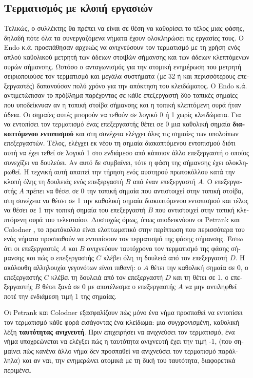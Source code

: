 \begin{greek}
\subsection{Τερματισμός με κλοπή εργασιών}
Τελικώς, ο συλλέκτης θα πρέπει να είναι σε θέση να καθορίσει
το τέλος μιας φάσης, δηλαδή πότε όλα τα συνεργαζόμενα νήματα
έχουν ολοκληρώσει τις εργασίες τους. Ο Endo κ.ά. \cite{DBLP:conf/sc/EndoTY97}
προσπάθησαν αρχικώς να ανιχνεύσουν τον τερματισμό με τη χρήση
ενός απλού καθολικού μετρητή των άδειων στοιβών σήμανσης και
των άδειων κλεπτόμενων ουρών σήμανσης. Ωστόσο ο ανταγωνισμός
για την ατομική ενημέρωση του μετρητή σειριοποιούσε τον τερματισμό
και μεγάλα συστήματα (με 32 ή και περισσότερους επεξεργαστές)
δαπανούσαν πολύ χρόνο για την απόκτηση του κλειδώματος.
O Endo κ.ά. αντιμετώπισαν το πρόβλημα παρέχοντας σε κάθε επεξεργαστή
δύο τοπικές σημαίες που υποδείκνυαν αν η τοπική στοίβα σήμανσης
και η τοπική κλεπτόμενη ουρά ήταν άδεια. Οι σημαίες αυτές
μπορούν να τεθούν σε λογικό 0 ή 1 χωρίς κλειδώματα. Για να
εντοπίσει τον τερματισμό ένας επεξεργαστής θέτει σε 0 μια
καθολική σημαία \textbf{διακοπτόμενου εντοπισμού} και στη
συνέχεια ελέγχει όλες τις σημαίες των υπολοίπων επεξεργαστών.
Τέλος, ελέγχει εκ νέου τη σημαία διακοπτόμενου εντοπισμού
διότι αυτή να έχει τεθεί σε λογικό 1 στο ενδιάμεσο από κάποιον
άλλο επεξεργαστή ο οποίος συνεχίζει να δουλεύει. Αν αυτό
δε συμβαίνει, τότε η φάση της σήμανσης έχει ολοκληρωθεί.
Η τεχνική αυτή απαιτεί την τήρηση ενός αυστηρού πρωτοκόλλου
κατά την κλοπή όλης τη δουλειάς ενός επεξεργαστή $B$ από
έναν επεξεργαστή $A$. Ο επεξεργαστής $A$ πρέπει να θέσει σε
0 την τοπική σημαία που αντιστοιχεί στην τοπική στοίβα, στη
συνέχεια να θέσει σε 1 την καθολική σημαία διακοπτόμενου
εντοπισμού και τέλος να θέσει σε 1 την τοπική σημαία του
επεξεργαστή $B$ που αντιστοιχεί στην τοπική κλεπτόμενη ουρά
του τελευταίου. Δυστυχώς όμως, όπως αποδεικνύουν οι Petrank
και Colodner \cite{DBLP:journals/ppl/PetrankK04}, το πρωτόκολλο
είναι ελαττωματικό στην περίπτωση που περισσότερα του ενός
νήματα προσπαθούν να εντοπίσουν τον τερματισμό της φάσης
σήμανσης. Έστω ότι οι επεξεργαστές $A$ και $B$ ανιχνεύουν
ταυτόχρονα τον τερματισμό της φάσης σήμανσης και πώς ο επεξεργαστής
$C$ κλέβει όλη τη δουλειά από τον επεξεργαστή $D$. Η ακόλουθη
αλληλουχία γεγονότων είναι πιθανή: ο $A$ θέτει την καθολική
σημαία σε 0, ο επεξεργαστής $C$ κλέβει τη δουλειά από τον επεξεργαστή
$D$ και τη θέτει σε 1, ο επεξεργαστής $B$ θέτει ξανά σε 0
με αποτέλεσμα ο επεξεργαστής $A$ να μην αντιληφθεί ποτέ την
ενδιάμεση τιμή 1 της σημαίας.

Οι Petrank και Colodner \cite{DBLP:journals/ppl/PetrankK04}
εξασφαλίζουν πώς μόνο ένα νήμα προσπαθεί να εντοπίσει τον
τερματισμό κάθε φορά εισάγοντας ένα κλείδωμα: μια συγχρονισμένη,
καθολική λέξη \textbf{ταυτότητας ανιχνευτή}. Πριν επιχειρήσει
να ανιχνεύσει τον τερματισμό, ένα νήμα υποχρεώνεται να ελέγξει
πώς η ταυτότητα ανιχνευτή έχει την τιμή -1, (που σημαίνει πώς
κανένα άλλο νήμα δεν προσπαθεί να ανιχνεύσει τον τερματισμό
παράλληλα) και αν ναι, την ενημερώνει ατομικά με τη δική του
ταυτότητα, διαφορετικά περιμένει.


\end{greek}
